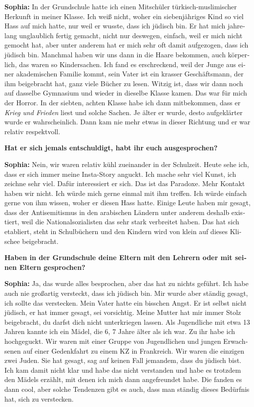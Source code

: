 \begin{otherlanguage}{ngerman}
\sloppy
\textbf{Sophia:} In der Grundschule hatte ich einen Mitschüler türkisch-muslimischer Herkunft in meiner Klasse. Ich weiß nicht, woher ein siebenjähriges Kind so viel Hass auf mich hatte, nur weil er wusste, dass ich jüdisch bin. Er hat mich jahrelang unglaublich fertig gemacht, nicht nur deswegen, einfach, weil er mich nicht gemocht hat, aber unter anderem hat er mich sehr oft damit aufgezogen, dass ich jüdisch bin. Manchmal haben wir uns dann in die Haare bekommen, auch körperlich, das waren so Kindersachen. Ich fand es erschreckend, weil der Junge aus einer akademischen Familie kommt, sein Vater ist ein krasser Geschäftsmann, der ihm beigebracht hat, ganz viele Bücher zu lesen. Witzig ist, dass wir dann noch auf dasselbe Gymnasium und wieder in dieselbe Klasse kamen. Das war für mich der Horror. In der siebten, achten Klasse habe ich dann mitbekommen, dass er \textit{Krieg und Frieden} liest und solche Sachen. Je älter er wurde, desto aufgeklärter wurde er wahrscheinlich. Dann kam nie mehr etwas in dieser Richtung und er war relativ respektvoll.  

\textbf{Hat er sich jemals entschuldigt, habt ihr euch ausgesprochen?}

\textbf{Sophia:} Nein, wir waren relativ kühl zueinander in der Schulzeit. Heute sehe ich, dass er sich immer meine Insta-Story anguckt. Ich mache sehr viel Kunst, ich zeichne sehr viel. Dafür interessiert er sich. Das ist das Paradoxe. Mehr Kontakt haben wir nicht. Ich würde mich gerne einmal mit ihm treffen. Ich würde einfach gerne von ihm wissen, woher er diesen Hass hatte. Einige Leute haben mir gesagt, dass der Antisemitismus in den arabischen Ländern unter anderem deshalb existiert, weil die Nationalsozialisten das sehr stark verbreitet haben. Das hat sich etabliert, steht in Schulbüchern und den Kindern wird von klein auf dieses Klischee beigebracht.   

\textbf{Haben in der Grundschule deine Eltern mit den Lehrern oder mit seinen Eltern gesprochen?}   

\textbf{Sophia:} Ja, das wurde alles besprochen, aber das hat zu nichts geführt. Ich habe auch nie großartig versteckt, dass ich jüdisch bin. Mir wurde aber ständig gesagt, ich sollte das verstecken. Mein Vater hatte ein bisschen Angst. Er ist selbst nicht jüdisch, er hat immer gesagt, sei vorsichtig. Meine Mutter hat mir immer Stolz beigebracht, du darfst dich nicht unterkriegen lassen. Als Jugendliche mit etwa 13 Jahren kannte ich ein Mädel, die 6, 7 Jahre älter als ich war. Zu ihr habe ich hochgeguckt. Wir waren mit einer Gruppe von Jugendlichen und jungen Erwachsenen auf einer Gedenkfahrt zu einem KZ in Frankreich. Wir waren die einzigen zwei Juden. Sie hat gesagt, sag auf keinen Fall jemandem, dass du jüdisch bist. Ich kam damit nicht klar und habe das nicht verstanden und habe es trotzdem den Mädels erzählt, mit denen ich mich dann angefreundet habe. Die fanden es dann cool, aber solche Tendenzen gibt es auch, dass man ständig dieses Bedürfnis hat, sich zu verstecken.  


\end{otherlanguage}
